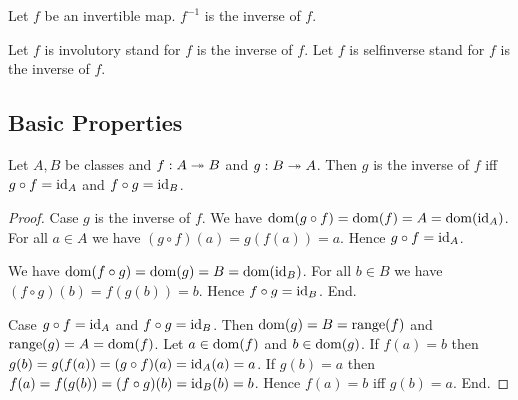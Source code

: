 \documentclass[10pt]{article}
\begin{document}
  \begin{forthel}
    \begin{definition}[id=FOUNDATIONS_09_6458627204317184,printid]
      Let $f$ be an invertible map.
      $f^{-1}$ is the inverse of $f$.
    \end{definition}

    Let $f$ is involutory stand for $f$ is the inverse of $f$.
    Let $f$ is selfinverse stand for $f$ is the inverse of $f$.
  \end{forthel}


  \subsection*{Basic Properties}

  \begin{forthel}
    \begin{proposition}[id=FOUNDATIONS_09_7840743571849216,printid]
      Let $A, B$ be classes and $f : A \twoheadrightarrow B$ and $g : B \twoheadrightarrow A$.
      Then $g$ is the inverse of $f$ iff $g \circ f = \textrm{id}_{A}$ and $f \circ g = \textrm{id}_{B}$.
    \end{proposition}
    \begin{proof}
      Case $g$ is the inverse of $f$.
        We have
        $\operatorname{dom}(g \circ f)
          = \operatorname{dom}(f)
          = A
          = \operatorname{dom}(\textrm{id}_{A})$.
        For all $a \in A$ we have
        $(g \circ f)(a)
          = g(f(a))
          = a$.
        Hence $g \circ f = \textrm{id}_{A}$.

        We have
        $\operatorname{dom}(f \circ g)
          = \operatorname{dom}(g)
          = B
          = \operatorname{dom}(\textrm{id}_{B})$.
        For all $b \in B$ we have
        $(f \circ g)(b)
          = f(g(b))
          = b$.
        Hence $f \circ g = \textrm{id}_{B}$.
      End.

      Case $g \circ f = \textrm{id}_{A}$ and $f \circ g = \textrm{id}_{B}$.
        Then $\operatorname{dom}(g)
          = B
          = \textrm{range}(f)$
        and $\textrm{range}(g)
          = A
          = \operatorname{dom}(f)$.
        Let $a \in \operatorname{dom}(f)$ and $b \in \operatorname{dom}(g)$.
        If $f(a) = b$ then
        $g(b)
          = g(f(a))
          = (g \circ f)(a)
          = \textrm{id}_{A}(a)
          = a$.
        If $g(b) = a$ then
        $f(a)
          = f(g(b))
          = (f \circ g)(b)
          = \textrm{id}_{B}(b)
          = b$.
        Hence $f(a) = b$ iff $g(b) = a$.
      End.
    \end{proof}
  \end{forthel}
\end{document}
